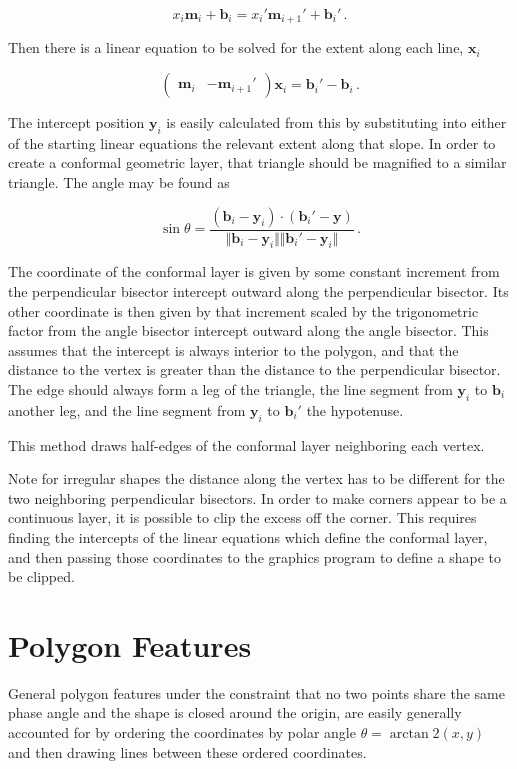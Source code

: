 \documentclass{article}
\begin{document}
$$ x_i \mathbf{m}_i + \mathbf{b}_{i} = x_i' \mathbf{m}_{i+1}' + \mathbf{b}_i'\,.$$

Then there is a linear equation to be solved for the extent along each line, $\mathbf{x}_i$

$$ \begin{pmatrix} \mathbf{m}_i & -\mathbf{m}_{i+1}' \end{pmatrix} \mathbf{x}_i = \mathbf{b}_i' - \mathbf{b}_i \,.$$

    The intercept position $\mathbf{y}_i$ is easily calculated from this by substituting into either of the starting linear equations the relevant extent along that slope. In order to create a conformal geometric layer, that triangle should be magnified to a similar triangle. The angle may be found as 

$$\sin\theta = \frac{ (\mathbf{b}_i - \mathbf{y}_i) \cdot (\mathbf{b}_i' - \mathbf{y}) }{ \Vert \mathbf{b}_i - \mathbf{y}_i \Vert \Vert \mathbf{b}_i' - \mathbf{y}_i \Vert } \,.  $$

The coordinate of the conformal layer is given by some constant increment from the perpendicular bisector intercept outward along the perpendicular bisector. Its other coordinate is then given by that increment scaled by the trigonometric factor from the angle bisector intercept outward along the angle bisector. This assumes that the intercept is always interior to the polygon, and that the distance to the vertex is greater than the distance to the perpendicular bisector. The edge should always form a leg of the triangle, the line segment from $\mathbf{y}_i$ to $\mathbf{b}_i$ another leg, and the line segment from $\mathbf{y}_i$ to $\mathbf{b}_i'$ the hypotenuse.

This method draws half-edges of the conformal layer neighboring each vertex.

Note for irregular shapes the distance along the vertex has to be different for the two neighboring perpendicular bisectors. In order to make corners appear to be a continuous layer, it is possible to clip the excess off the corner. This requires finding the intercepts of the linear equations which define the conformal layer, and then passing those coordinates to the graphics program to define a shape to be clipped.

\section{Polygon Features}
General polygon features under the constraint that no two points share the same phase angle and the shape is closed around the origin, are easily generally accounted for by ordering the coordinates by polar angle $\theta = \arctan2(x,y)$ and then drawing lines between these ordered coordinates.
\end{document}
